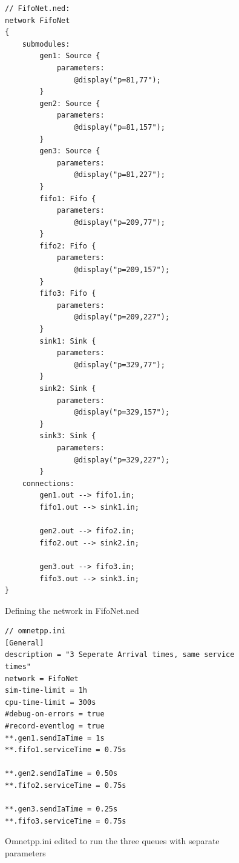 \documentclass{article}
\begin{document}
\begin{figure}[H]
\label{FifoNet}
\begin{lstlisting}
// FifoNet.ned:
network FifoNet
{
    submodules:
        gen1: Source {
            parameters:
                @display("p=81,77");
        }
        gen2: Source {
            parameters:
                @display("p=81,157");
        }
        gen3: Source {
            parameters:
                @display("p=81,227");
        }
        fifo1: Fifo {
            parameters:
                @display("p=209,77");
        }
        fifo2: Fifo {
            parameters:
                @display("p=209,157");
        }
        fifo3: Fifo {
            parameters:
                @display("p=209,227");
        }
        sink1: Sink {
            parameters:
                @display("p=329,77");
        }
        sink2: Sink {
            parameters:
                @display("p=329,157");
        }
        sink3: Sink {
            parameters:
                @display("p=329,227");
        }
    connections:
        gen1.out --> fifo1.in;
        fifo1.out --> sink1.in;

        gen2.out --> fifo2.in;
        fifo2.out --> sink2.in;

        gen3.out --> fifo3.in;
        fifo3.out --> sink3.in;
}
\end{lstlisting}
\vspace{-1cm}
\caption*{Defining the network in FifoNet.ned}
\end{figure}

\begin{figure}[H]
\label{Omnet_ini}
\begin{lstlisting}
// omnetpp.ini
[General]
description = "3 Seperate Arrival times, same service times"
network = FifoNet
sim-time-limit = 1h
cpu-time-limit = 300s
#debug-on-errors = true
#record-eventlog = true
**.gen1.sendIaTime = 1s
**.fifo1.serviceTime = 0.75s

**.gen2.sendIaTime = 0.50s
**.fifo2.serviceTime = 0.75s

**.gen3.sendIaTime = 0.25s
**.fifo3.serviceTime = 0.75s
\end{lstlisting}
\vspace{-1cm}
\caption*{Omnetpp.ini edited to run the three queues with separate parameters}
\end{figure}
\end{document}

